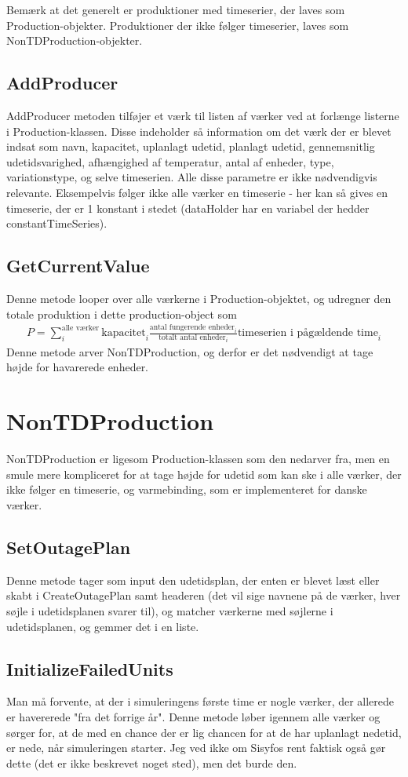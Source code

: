 \documentclass{article}
\begin{document}
Bemærk at det generelt er produktioner med timeserier, der laves som Production-objekter. Produktioner der ikke følger timeserier, laves som NonTDProduction-objekter. 
\subsection{AddProducer}
AddProducer metoden tilføjer et værk til listen af værker ved at forlænge listerne i Production-klassen. Disse indeholder så information om det værk der er blevet indsat som navn, kapacitet, uplanlagt udetid, planlagt udetid, gennemsnitlig udetidsvarighed, afhængighed af temperatur, antal af enheder, type, variationstype, og selve timeserien. Alle disse parametre er ikke nødvendigvis relevante. Eksempelvis følger ikke alle værker en timeserie - her kan så gives en timeserie, der er 1 konstant i stedet (dataHolder har en variabel der hedder constantTimeSeries).
\subsection{GetCurrentValue}
Denne metode looper over alle værkerne i Production-objektet, og udregner den totale produktion i dette production-object som
\begin{align}
    P = \sum_i^{\text{alle værker}} \text{kapacitet}_i\frac{\text{antal fungerende enheder}_i}{\text{totalt antal enheder}_i}\text{timeserien i pågældende time}_i
\end{align}
Denne metode arver NonTDProduction, og derfor er det nødvendigt at tage højde for havarerede enheder. 
\section{NonTDProduction}
NonTDProduction er ligesom Production-klassen som den nedarver fra, men en smule mere kompliceret for at tage højde for udetid som kan ske i alle værker, der ikke følger en timeserie, og varmebinding, som er implementeret for danske værker. 
\subsection{SetOutagePlan}
Denne metode tager som input den udetidsplan, der enten er blevet læst eller skabt i CreateOutagePlan samt headeren (det vil sige navnene på de værker, hver søjle i udetidsplanen svarer til), og matcher værkerne med søjlerne i udetidsplanen, og gemmer det i en liste.
\subsection{InitializeFailedUnits}
Man må forvente, at der i simuleringens første time er nogle værker, der allerede er havererede "fra det forrige år". Denne metode løber igennem alle værker og sørger for, at de med en chance der er lig chancen for at de har uplanlagt nedetid, er nede, når simuleringen starter. Jeg ved ikke om Sisyfos rent faktisk også gør dette (det er ikke beskrevet noget sted), men det burde den. 
\end{document}
